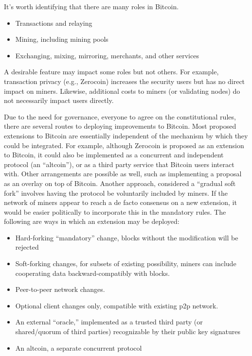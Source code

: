 It's worth identifying that there are many roles in Bitcoin.
\begin{itemize}
\item Transactions and relaying
\item Mining, including mining pools
\item Exchanging, mixing, mirroring, merchants, and other services
\end{itemize}
A desirable feature may impact some roles but not others. For example, transaction privacy (e.g., Zerocoin) increases the security users but has no direct impact on miners. Likewise, additional costs to miners (or validating nodes) do not necessarily impact users directly.

Due to the need for governance, everyone to agree on the constitutional rules, there are several routes to deploying improvements to Bitcoin. Most proposed extensions to Bitcoin are essentially independent of the mechanism by which they could be integrated. For example, although Zerocoin is proposed as an extension to Bitcoin, it could also be implemented as a concurrent and independent protocol (an ``altcoin''), or as a third party service that Bitcoin users interact with. Other arrangements are possible as well, such as implementing a proposal as an overlay on top of Bitcoin. Another approach, considered a ``gradual soft fork'' involves having the protocol be voluntarily included by miners. If the network of miners appear to reach a de facto consensus on a new extension, it would be easier politically to incorporate this in the mandatory rules. The following are ways in which an extension may be deployed:

\begin{itemize}
\item Hard-forking ``mandatory'' change, blocks without the modification will be rejected
\item Soft-forking changes, for subsets of existing possibility, miners can include cooperating data backward-compatibly with blocks.
\item Peer-to-peer network changes.
\item Optional client changes only, compatible with existing p2p network.
\item An external ``oracle,'' implemented as a trusted third party (or shared/quorum of third parties) recognizable by their public key signatures
\item An altcoin, a separate concurrent protocol
\end{itemize}


